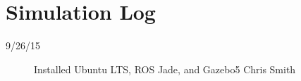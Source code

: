 \section{Simulation Log}

\begin{description}
\item [9/26/15]  Installed Ubuntu LTS, ROS Jade, and Gazebo5 \hfill{Chris Smith}
\end{description}